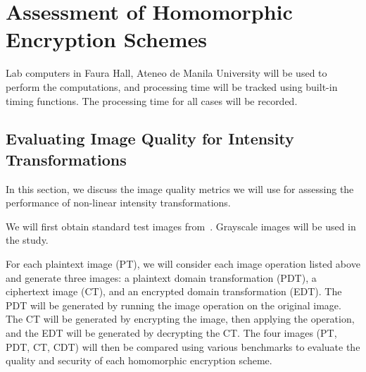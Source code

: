 


\section{Assessment of Homomorphic Encryption Schemes}

Lab computers in Faura Hall, Ateneo de Manila University will be used to perform the computations, and processing time will be tracked using built-in timing functions.
The processing time for all cases will be recorded.

\subsection{Evaluating Image Quality for Intensity Transformations}
In this section, we discuss the image quality metrics we will use for assessing the performance of non-linear intensity transformations.

We will first obtain standard test images from~\cite{gonzalez_image_nodate}. Grayscale images will be used in the study.

For each plaintext image (PT), we will consider each image operation listed above and generate three images: a plaintext domain transformation (PDT), a ciphertext image (CT), and an encrypted domain transformation (EDT). The PDT will be generated by running the image operation on the original image. The CT will be generated by encrypting the image, then applying the operation, and the EDT will be generated by decrypting the CT. The four images (PT, PDT, CT, CDT) will then be compared using various benchmarks to evaluate the quality and security of each homomorphic encryption scheme.

